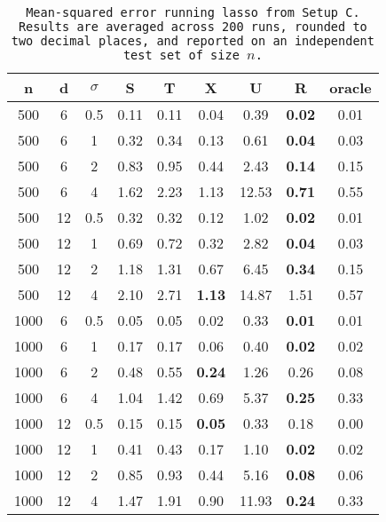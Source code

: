 \begin{table}[ht]
\centering
\begin{tabular}{ccccccccc}
  \hline
n & d & $\sigma$ & S & T & X & U & R & oracle \\ 
  \hline
500 & 6 & 0.5 & 0.11 & 0.11 & 0.04 &  0.39 & \bf 0.02 & 0.01 \\ 
  500 & 6 & 1 & 0.32 & 0.34 & 0.13 &  0.61 & \bf 0.04 & 0.03 \\ 
  500 & 6 & 2 & 0.83 & 0.95 & 0.44 &  2.43 & \bf 0.14 & 0.15 \\ 
  500 & 6 & 4 & 1.62 & 2.23 & 1.13 & 12.53 & \bf 0.71 & 0.55 \\ 
  500 & 12 & 0.5 & 0.32 & 0.32 & 0.12 &  1.02 & \bf 0.02 & 0.01 \\ 
  500 & 12 & 1 & 0.69 & 0.72 & 0.32 &  2.82 & \bf 0.04 & 0.03 \\ 
  500 & 12 & 2 & 1.18 & 1.31 & 0.67 &  6.45 & \bf 0.34 & 0.15 \\ 
  500 & 12 & 4 & 2.10 & 2.71 & \bf 1.13 & 14.87 & 1.51 & 0.57 \\ 
  1000 & 6 & 0.5 & 0.05 & 0.05 & 0.02 &  0.33 & \bf 0.01 & 0.01 \\ 
  1000 & 6 & 1 & 0.17 & 0.17 & 0.06 &  0.40 & \bf 0.02 & 0.02 \\ 
  1000 & 6 & 2 & 0.48 & 0.55 & \bf 0.24 &  1.26 & 0.26 & 0.08 \\ 
  1000 & 6 & 4 & 1.04 & 1.42 & 0.69 &  5.37 & \bf 0.25 & 0.33 \\ 
  1000 & 12 & 0.5 & 0.15 & 0.15 & \bf 0.05 &  0.33 & 0.18 & 0.00 \\ 
  1000 & 12 & 1 & 0.41 & 0.43 & 0.17 &  1.10 & \bf 0.02 & 0.02 \\ 
  1000 & 12 & 2 & 0.85 & 0.93 & 0.44 &  5.16 & \bf 0.08 & 0.06 \\ 
  1000 & 12 & 4 & 1.47 & 1.91 & 0.90 & 11.93 & \bf 0.24 & 0.33 \\ 
   \hline
\end{tabular}
\caption{\tt Mean-squared error running \texttt{lasso} from Setup C. Results are averaged across 200 runs, rounded to two decimal places, and reported on an independent test set of size $n$.} 
\label{table:setup3}
\end{table}

